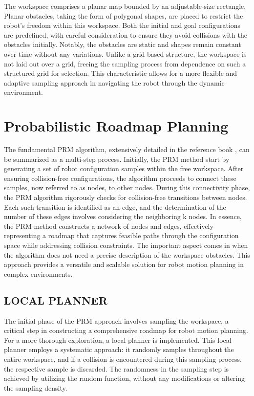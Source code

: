\documentclass{IEEEtaes}
\begin{document}
The workspace comprises a planar map bounded by an adjustable-size rectangle. Planar obstacles, taking the form of polygonal shapes, are placed to restrict the robot's freedom within this workspace. Both the initial and goal configurations are predefined, with careful consideration to ensure they avoid collisions with the obstacles initially. Notably, the obstacles are static and shapes remain constant over time without any variations. Unlike a grid-based structure, the workspace is not laid out over a grid, freeing the sampling process from dependence on such a structured grid for selection. This characteristic allows for a more flexible and adaptive sampling approach in navigating the robot through the dynamic environment.


\section{\large \textbf{Probabilistic Roadmap Planning}}
The fundamental PRM algorithm, extensively detailed in the reference book \cite{choset}, can be summarized as a multi-step process. Initially, the PRM method start by generating a set of robot configuration samples within the free workspace. After ensuring collision-free configurations, the algorithm proceeds to connect these samples, now referred to as nodes, to other nodes. During this connectivity phase, the PRM algorithm rigorously checks for collision-free transitions between nodes. Each such transition is identified as an edge, and the determination of the number of these edges involves considering the neighboring k nodes. In essence, the PRM method constructs a network of nodes and edges, effectively representing a roadmap that captures feasible paths through the configuration space while addressing collision constraints. The important aspect comes in when the algorithm does not need a precise description of the workspace obstacles. This approach provides a versatile and scalable solution for robot motion planning in complex environments.


\subsection{\fontsize{10}{13}\selectfont LOCAL PLANNER}
The initial phase of the PRM approach involves sampling the workspace, a critical step in constructing a comprehensive roadmap for robot motion planning. For a more thorough exploration, a local planner is implemented. This local planner employs a systematic approach: it randomly samples throughout the entire workspace, and if a collision is encountered during this sampling process, the respective sample is discarded. The randomness in the sampling step is achieved by utilizing the random function, without any modifications or altering the sampling density.
\end{document}
